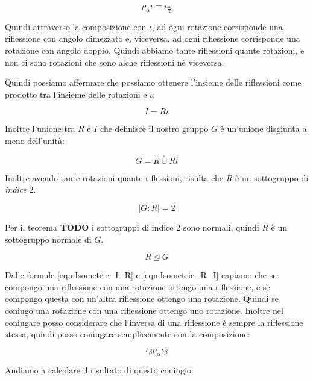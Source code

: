 \begin{equation}
	\rho_\alpha \iota = \iota_{\frac{\alpha}{2}}
\end{equation}

Quindi attraverso la composizione con $\iota$, ad ogni rotazione corrisponde una riflessione con angolo dimezzato e, viceversa, ad ogni riflessione corrisponde una rotazione con angolo doppio. Quindi abbiamo tante riflessioni quante rotazioni, e non ci sono rotazioni che sono alche riflessioni nè viceversa.

Quindi possiamo affermare che possiamo ottenere l'insieme delle riflessioni come prodotto tra l'insieme delle rotazioni e $\iota$:

\begin{equation}
	I = R\iota
\end{equation}

Inoltre l'unione tra $R$ e $I$ che definisce il nostro gruppo $G$ è un'unione disgiunta a meno dell'unità:

\begin{equation}
	G = R \overset{\circ}{\cup} R\iota
\end{equation}

Inoltre avendo tante rotazioni quante riflessioni, risulta che $R$ è un sottogruppo di \emph{indice} 2.

\begin{equation}
	|G:R| = 2
\end{equation}

Per il teorema \textbf{TODO} i sottogruppi di indice 2 sono normali, quindi $R$ è un sottogruppo normale di $G$.

\begin{equation}
	R \unlhd G
\end{equation}

Dalle formule \eqref{eqn:Isometrie_I_R} e \eqref{eqn:Isometrie_R_I} capiamo che se compongo una riflessione con una rotazione ottengo una riflessione, e se compongo questa con un'altra riflessione ottengo una rotazione. Quindi se coniugo una rotazione con una riflessione ottengo uno rotazione.
Inoltre nel coniugare posso considerare che l'inversa di una riflessione è sempre la riflessione stessa, quindi posso coniugare semplicemente con la composizione:

\begin{equation}
	\iota_\beta \rho_\alpha \iota_\beta
\end{equation}

Andiamo a calcolare il risultato di questo coniugio:

